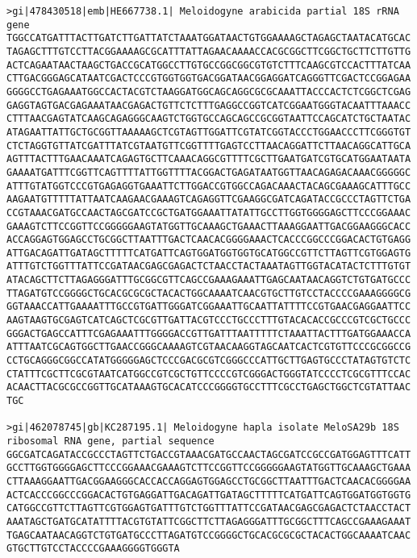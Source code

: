 \documentclass[11pt]{article}
\begin{document}
\begin{Verbatim}[commandchars=\\\{\}]
>gi|478430518|emb|HE667738.1| Meloidogyne arabicida partial 18S rRNA gene
TGGCCATGATTTACTTGATCTTGATTATCTAAATGGATAACTGTGGAAAAGCTAGAGCTAATACATGCAC
TAGAGCTTTGTCCTTACGGAAAAGCGCATTTATTAGAACAAAACCACGCGGCTTCGGCTGCTTCTTGTTG
ACTCAGAATAACTAAGCTGACCGCATGGCCTTGTGCCGGCGGCGTGTCTTTCAAGCGTCCACTTTATCAA
CTTGACGGGAGCATAATCGACTCCCGTGGTGGTGACGGATAACGGAGGATCAGGGTTCGACTCCGGAGAA
GGGGCCTGAGAAATGGCCACTACGTCTAAGGATGGCAGCAGGCGCGCAAATTACCCACTCTCGGCTCGAG
GAGGTAGTGACGAGAAATAACGAGACTGTTCTCTTTGAGGCCGGTCATCGGAATGGGTACAATTTAAACC
CTTTAACGAGTATCAAGCAGAGGGCAAGTCTGGTGCCAGCAGCCGCGGTAATTCCAGCATCTGCTAATAC
ATAGAATTATTGCTGCGGTTAAAAAGCTCGTAGTTGGATTCGTATCGGTACCCTGGAACCCTTCGGGTGT
CTCTAGGTGTTATCGATTTATCGTAATGTTCGGTTTTGAGTCCTTAACAGGATTCTTAACAGGCATTGCA
AGTTTACTTTGAACAAATCAGAGTGCTTCAAACAGGCGTTTTCGCTTGAATGATCGTGCATGGAATAATA
GAAAATGATTTCGGTTCAGTTTTATTGGTTTTACGGACTGAGATAATGGTTAACAGAGACAAACGGGGGC
ATTTGTATGGTCCCGTGAGAGGTGAAATTCTTGGACCGTGGCCAGACAAACTACAGCGAAAGCATTTGCC
AAGAATGTTTTTATTAATCAAGAACGAAAGTCAGAGGTTCGAAGGCGATCAGATACCGCCCTAGTTCTGA
CCGTAAACGATGCCAACTAGCGATCCGCTGATGGAAATTATATTGCCTTGGTGGGGAGCTTCCCGGAAAC
GAAAGTCTTCCGGTTCCGGGGGAAGTATGGTTGCAAAGCTGAAACTTAAAGGAATTGACGGAAGGGCACC
ACCAGGAGTGGAGCCTGCGGCTTAATTTGACTCAACACGGGGAAACTCACCCGGCCCGGACACTGTGAGG
ATTGACAGATTGATAGCTTTTTCATGATTCAGTGGATGGTGGTGCATGGCCGTTCTTAGTTCGTGGAGTG
ATTTGTCTGGTTTATTCCGATAACGAGCGAGACTCTAACCTACTAAATAGTTGGTACATACTCTTTGTGT
ATACAGCTTCTTAGAGGGATTTGCGGCGTTCAGCCGAAAGAAATTGAGCAATAACAGGTCTGTGATGCCC
TTAGATGTCCGGGGCTGCACGCGCGCTACACTGGCAAAATCAACGTGCTTGTCCTACCCCGAAAGGGGCG
GGTAAACCATTGAAAATTTGCCGTGATTGGGATCGGAAATTGCAATTATTTTCCGTGAACGAGGAATTCC
AAGTAAGTGCGAGTCATCAGCTCGCGTTGATTACGTCCCTGCCCTTTGTACACACCGCCCGTCGCTGCCC
GGGACTGAGCCATTTCGAGAAATTTGGGGACCGTTGATTTAATTTTTCTAAATTACTTTGATGGAAACCA
ATTTAATCGCAGTGGCTTGAACCGGGCAAAAGTCGTAACAAGGTAGCAATCACTCGTGTTCCCGCGGCCG
CCTGCAGGGCGGCCATATGGGGGAGCTCCCGACGCGTCGGGCCCATTGCTTGAGTGCCCTATAGTGTCTC
CTATTTCGCTTCGCGTAATCATGGCCGTCGCTGTTCCCCGTCGGGACTGGGTATCCCCTCGCGTTTCCAC
ACAACTTACGCGCCGGTTGCATAAAGTGCACATCCCGGGGTGCCTTTCGCCTGAGCTGGCTCGTATTAAC
TGC

>gi|462078745|gb|KC287195.1| Meloidogyne hapla isolate MeloSA29b 18S ribosomal RNA gene, partial sequence
GGCGATCAGATACCGCCCTAGTTCTGACCGTAAACGATGCCAACTAGCGATCCGCCGATGGAGTTTCATT
GCCTTGGTGGGGAGCTTCCCGGAAACGAAAGTCTTCCGGTTCCGGGGGAAGTATGGTTGCAAAGCTGAAA
CTTAAAGGAATTGACGGAAGGGCACCACCAGGAGTGGAGCCTGCGGCTTAATTTGACTCAACACGGGGAA
ACTCACCCGGCCCGGACACTGTGAGGATTGACAGATTGATAGCTTTTTCATGATTCAGTGGATGGTGGTG
CATGGCCGTTCTTAGTTCGTGGAGTGATTTGTCTGGTTTATTCCGATAACGAGCGAGACTCTAACCTACT
AAATAGCTGATGCATATTTTACGTGTATTCGGCTTCTTAGAGGGATTTGCGGCTTTCAGCCGAAAGAAAT
TGAGCAATAACAGGTCTGTGATGCCCTTAGATGTCCGGGGCTGCACGCGCGCTACACTGGCAAAATCAAC
GTGCTTGTCCTACCCCGAAAGGGGTGGGTA


\end{Verbatim}
\end{document}
